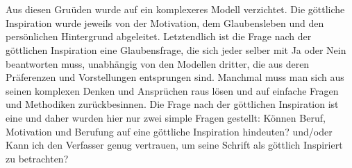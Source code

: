 \\~\\
Aus diesen Gruüden wurde auf ein komplexeres Modell verzichtet. Die göttliche Inspiration wurde jeweils von der Motivation, dem Glaubensleben und den persönlichen Hintergrund abgeleitet. Letztendlich ist die Frage nach der göttlichen Inspiration eine Glaubensfrage, die sich jeder selber mit Ja oder Nein beantworten muss, unabhängig von den Modellen dritter, die aus deren Präferenzen und Vorstellungen entsprungen sind. Manchmal muss man sich aus seinen komplexen Denken und Ansprüchen raus lösen und auf einfache Fragen und Methodiken zurückbesinnen. Die Frage nach der göttlichen Inspiration ist eine und daher wurden hier nur zwei simple Fragen gestellt: Können Beruf, Motivation und Berufung auf eine göttliche Inspiration hindeuten? und/oder Kann ich den Verfasser genug vertrauen, um seine Schrift als göttlich Inspiriert zu betrachten?
\pagebreak
